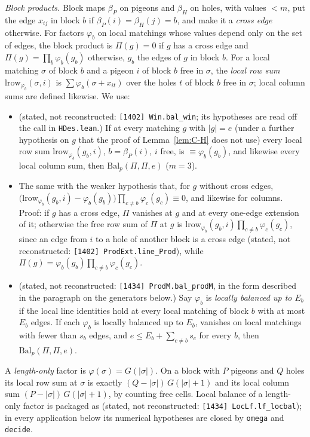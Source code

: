 \emph{Block products.}  Block maps $\beta_P$ on pigeons and $\beta_H$ on holes, with values
$<m$, put the edge $x_{ij}$ in block $b$ if $\beta_P(i)=\beta_H(j)=b$, and make it a
\emph{cross edge} otherwise.  For factors $\varphi_b$ on local matchings whose values depend
only on the set of edges, the block product is $\Pi(g)=0$ if $g$ has a cross edge and
$\Pi(g)=\prod_b\varphi_b(g_b)$ otherwise, $g_b$ the edges of $g$ in block $b$.  For a local
matching $\sigma$ of block $b$ and a pigeon $i$ of block $b$ free in $\sigma$, the
\emph{local row sum} $\mathrm{lrow}_{\varphi_b}(\sigma,i)$ is $\sum\varphi_b(\sigma+x_{it})$ over
the holes $t$ of block $b$ free in $\sigma$; local column sums are defined likewise.  We use:
\begin{itemize}
\item[(P1)] (stated, not reconstructed: \texttt{[1402] Win.bal\_win}; its hypotheses are read
off the call in \texttt{HDes.lean}.)  If at every matching $g$ with $|g|=e$ (under a further
hypothesis on $g$ that the proof of Lemma~\ref{lem:C-H} does not use) every local row sum
$\mathrm{lrow}_{\varphi_b}(g_b,i)$, $b=\beta_P(i)$, $i$ free, is $\equiv\varphi_b(g_b)$, and
likewise every local column sum, then $\mathrm{Bal}_p(\Pi,\Pi,e)$ ($m=3$).
\item[(P2)] The same with the weaker hypothesis that, for $g$ without cross edges,
$\bigl(\mathrm{lrow}_{\varphi_b}(g_b,i)-\varphi_b(g_b)\bigr)\prod_{c\ne b}\varphi_c(g_c)\equiv0$,
and likewise for columns.  Proof: if $g$ has a cross edge, $\Pi$
vanishes at $g$ and at every one-edge extension of it; otherwise the free row sum of $\Pi$ at
$g$ is $\mathrm{lrow}_{\varphi_b}(g_b,i)\prod_{c\ne b}\varphi_c(g_c)$, since an edge from $i$ to
a hole of another block is a cross edge (stated, not reconstructed: \texttt{[1402]
ProdExt.line\_Prod}), while $\Pi(g)=\varphi_b(g_b)\prod_{c\ne b}\varphi_c(g_c)$.
\item[(P3)] (stated, not reconstructed: \texttt{[1434] ProdM.bal\_prodM}, in the form
described in the paragraph on the generators below.)  Say $\varphi_b$ is \emph{locally balanced
up to $E_b$} if the local line identities hold at every local matching of block $b$ with at
most $E_b$ edges.  If
each $\varphi_b$ is locally balanced up to $E_b$, vanishes on local matchings with fewer than
$s_b$ edges, and $e\le E_b+\sum_{c\ne b}s_c$ for every $b$, then $\mathrm{Bal}_p(\Pi,\Pi,e)$.
\end{itemize}
A \emph{length-only} factor is $\varphi(\sigma)=G(|\sigma|)$.  On a block with $P$ pigeons and
$Q$ holes its local row sum at $\sigma$ is exactly $(Q-|\sigma|)\,G(|\sigma|+1)$ and its local
column sum $(P-|\sigma|)\,G(|\sigma|+1)$, by counting free cells.
Local balance of a length-only factor is packaged as (stated, not reconstructed:
\texttt{[1434] LocLf.lf\_locbal}); in every application below its numerical hypotheses
are closed by \texttt{omega} and \texttt{decide}.

